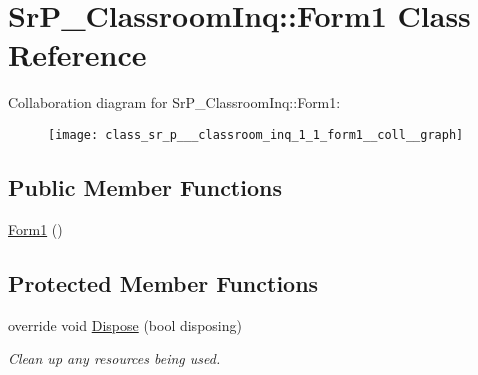 \hypertarget{class_sr_p___classroom_inq_1_1_form1}{
\section{\-Sr\-P\-\_\-\-Classroom\-Inq\-:\-:\-Form1 \-Class \-Reference}
\label{class_sr_p___classroom_inq_1_1_form1}
}


\-Collaboration diagram for \-Sr\-P\-\_\-\-Classroom\-Inq\-:\-:\-Form1\-:\nopagebreak
\begin{figure}[H]
\begin{center}
\leavevmode
\texttt{[image: class\_sr\_p\_\_\_classroom\_inq\_1\_1\_form1\_\_coll\_\_graph]}
\end{center}
\end{figure}
\subsection*{\-Public \-Member \-Functions}
\begin{DoxyCompactItemize}
\item 
\hyperlink{class_sr_p___classroom_inq_1_1_form1_af6bb96bce0d0e2ee4ecf22e9646d625c}{\-Form1} ()
\end{DoxyCompactItemize}
\subsection*{\-Protected \-Member \-Functions}
\begin{DoxyCompactItemize}
\item 
override void \hyperlink{class_sr_p___classroom_inq_1_1_form1_ac653b186a9b7176d47382c35d7474840}{\-Dispose} (bool disposing)
\begin{DoxyCompactList}\small\item\em \-Clean up any resources being used. \end{DoxyCompactList}\end{DoxyCompactItemize}
